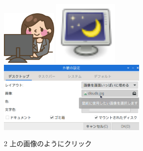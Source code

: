\documentclass[a4paper,12pt]{jarticle}
\begin{document}
\begin{figure}
\begin{minipage}{\textwidth}
\begin{minipage}{2.582cm}
    \end{minipage}
    \begin{minipage}{0.45\textwidth}
      \includegraphics[width=2.712cm]{textbook-img082.png}
      \hfill
      \includegraphics[width=3.193cm]{textbook-img106.png}\\
      \includegraphics[width=7.324cm]{textbook-img108.png}\\
      \begin{minipage}{8.035cm}
        2 上の画像のようにクリック
      \end{minipage}
    \end{minipage}

  \end{minipage}

  \begin{minipage}{\textwidth}


\end{minipage}
\end{figure}
\end{document}
